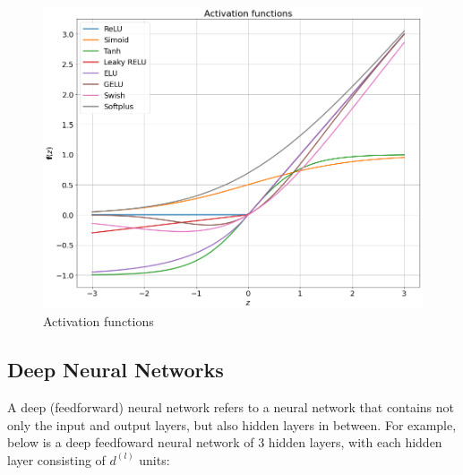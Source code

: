 \documentclass[14pt, a4paper]{article}
\numberwithin{equation}{section}
\numberwithin{algorithm}{section}
\numberwithin{figure}{section}
\begin{document}
\begin{figure}[h!]
  \centering
  \includegraphics[width=12cm]{activation_functions.png}
  \caption{Activation functions}
\end{figure}

\subsection{Deep Neural Networks}

A deep (feedforward) neural network refers to a neural network that contains not only the input and output layers, but also hidden layers in between. For example, below is a deep feedfoward neural network of 3 hidden layers, with each hidden layer consisting of $d^{(l)}$ units:
\end{document}
